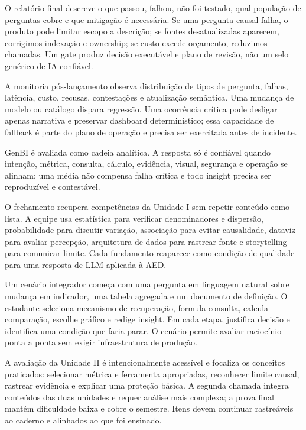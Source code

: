 O relatório final descreve o que passou, falhou, não foi testado, qual população de perguntas cobre e que mitigação é necessária. Se uma pergunta causal falha, o produto pode limitar escopo a descrição; se fontes desatualizadas aparecem, corrigimos indexação e ownership; se custo excede orçamento, reduzimos chamadas. Um gate produz decisão executável e plano de revisão, não um selo genérico de IA confiável.

A monitoria pós-lançamento observa distribuição de tipos de pergunta, falhas, latência, custo, recusas, contestações e atualização semântica. Uma mudança de modelo ou catálogo dispara regressão. Uma ocorrência crítica pode desligar apenas narrativa e preservar dashboard determinístico; essa capacidade de fallback é parte do plano de operação e precisa ser exercitada antes de incidente.

\begin{SummaryBox}
GenBI é avaliada como cadeia analítica. A resposta só é confiável quando intenção, métrica, consulta, cálculo, evidência, visual, segurança e operação se alinham; uma média não compensa falha crítica e todo insight precisa ser reproduzível e contestável.
\end{SummaryBox}



O fechamento recupera competências da Unidade I sem repetir conteúdo como lista. A equipe usa estatística para verificar denominadores e dispersão, probabilidade para discutir variação, associação para evitar causalidade, dataviz para avaliar percepção, arquitetura de dados para rastrear fonte e storytelling para comunicar limite. Cada fundamento reaparece como condição de qualidade para uma resposta de LLM aplicada à AED.

Um cenário integrador começa com uma pergunta em linguagem natural sobre mudança em indicador, uma tabela agregada e um documento de definição. O estudante seleciona mecanismo de recuperação, formula consulta, calcula comparação, escolhe gráfico e redige insight. Em cada etapa, justifica decisão e identifica uma condição que faria parar. O cenário permite avaliar raciocínio ponta a ponta sem exigir infraestrutura de produção.

A avaliação da Unidade II é intencionalmente acessível e focaliza os conceitos praticados: selecionar métrica e ferramenta apropriadas, reconhecer limite causal, rastrear evidência e explicar uma proteção básica. A segunda chamada integra conteúdos das duas unidades e requer análise mais complexa; a prova final mantém dificuldade baixa e cobre o semestre. Itens devem continuar rastreáveis ao caderno e alinhados ao que foi ensinado.

